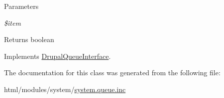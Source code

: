 \begin{DoxyParams}{Parameters}
\item[{\em \$item}]\end{DoxyParams}
\begin{DoxyReturn}{Returns}
boolean 
\end{DoxyReturn}


Implements \hyperlink{interfaceDrupalQueueInterface_a7f4ce9d592779327cd24dbf90566da67}{DrupalQueueInterface}.

The documentation for this class was generated from the following file:\begin{DoxyCompactItemize}
\item 
html/modules/system/\hyperlink{system_8queue_8inc}{system.queue.inc}\end{DoxyCompactItemize}
